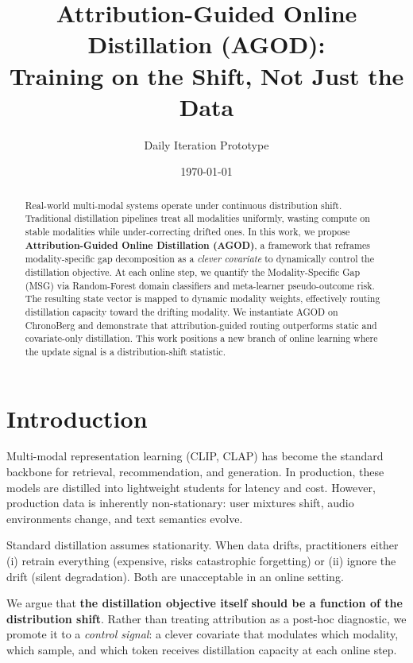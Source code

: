\documentclass[11pt]{article}
\title{\textbf{Attribution-Guided Online Distillation (AGOD):}\\
\large Training on the Shift, Not Just the Data}
\author{Daily Iteration Prototype}
\date{\today}
\begin{document}
\maketitle

\begin{abstract}
Real-world multi-modal systems operate under continuous distribution shift. Traditional distillation pipelines treat all modalities uniformly, wasting compute on stable modalities while under-correcting drifted ones. In this work, we propose \textbf{Attribution-Guided Online Distillation (AGOD)}, a framework that reframes modality-specific gap decomposition as a \emph{clever covariate} to dynamically control the distillation objective. At each online step, we quantify the Modality-Specific Gap (MSG) via Random-Forest domain classifiers and meta-learner pseudo-outcome risk. The resulting state vector is mapped to dynamic modality weights, effectively routing distillation capacity toward the drifting modality. We instantiate AGOD on ChronoBerg and demonstrate that attribution-guided routing outperforms static and covariate-only distillation. This work positions a new branch of online learning where the update signal is a distribution-shift statistic.
\end{abstract}

\section{Introduction}
\label{sec:intro}

Multi-modal representation learning (CLIP, CLAP) has become the standard backbone for retrieval, recommendation, and generation. In production, these models are distilled into lightweight students for latency and cost. However, production data is inherently non-stationary: user mixtures shift, audio environments change, and text semantics evolve.

Standard distillation assumes stationarity. When data drifts, practitioners either (i) retrain everything (expensive, risks catastrophic forgetting) or (ii) ignore the drift (silent degradation). Both are unacceptable in an online setting.

We argue that \textbf{the distillation objective itself should be a function of the distribution shift}. Rather than treating attribution as a post-hoc diagnostic, we promote it to a \emph{control signal}: a clever covariate that modulates which modality, which sample, and which token receives distillation capacity at each online step.
\end{document}
